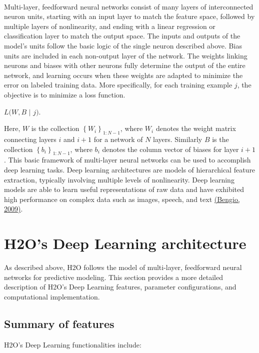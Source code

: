 \documentclass{article}[11pt]
\begin{document}
\\
\noindent
Multi-layer, feedforward neural networks consist of many layers of interconnected neuron units, starting with an input layer to match the feature space, followed by multiple layers of nonlinearity, and ending with a linear regression or classification layer to match the output space. The inputs and outputs of the model's units follow the basic logic of the single neuron described above. Bias units are included in each non-output layer of the network. The weights linking neurons and biases with other neurons fully determine the output of the entire network, and learning occurs when these weights are adapted to minimize the error on labeled training data. More specifically, for each training example $j$, the objective is to minimize a loss function. 
\begin{center}
$L(W,B$ $|$ $j)$.
\end{center}
Here, $W$ is the collection $\left\{W_i\right\}_{1:N-1}$, where $W_i$ denotes the weight matrix connecting layers $i$ and $i+1$ for a network of $N$ layers. Similarly $B$ is the collection $\left\{b_i\right\}_{1:N-1}$, where $b_i$ denotes the column vector of biases for layer $i+1$.
This basic framework of multi-layer neural networks can be used to accomplish deep learning tasks. Deep learning architectures are models of hierarchical feature extraction, typically involving multiple levels of nonlinearity. Deep learning models are able to learn useful representations of raw data and have exhibited high performance on complex data such as images, speech, and text \href{http://www.iro.umontreal.ca/~lisa/pointeurs/TR1312.pdf}{(Bengio, 2009)}. 


\section{H2O's Deep Learning architecture} 

As described above, H2O follows the model of multi-layer, feedforward neural networks for predictive modeling. This section provides a more detailed description of H2O's Deep Learning features, parameter configurations, and computational implementation.

\subsection{Summary of features} 
H2O's Deep Learning functionalities include:
\end{document}
